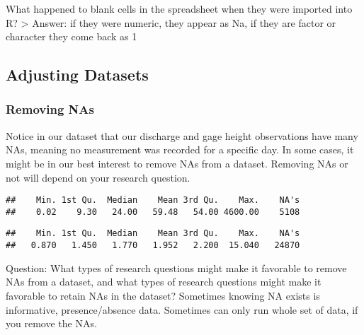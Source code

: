 \documentclass[]{article}
\newenvironment{Shaded}{\begin{snugshade}}{\end{snugshade}}
\newcommand{\KeywordTok}[1]{\textcolor[rgb]{0.13,0.29,0.53}{\textbf{#1}}}
\newcommand{\NormalTok}[1]{#1}
\newcommand{\OperatorTok}[1]{\textcolor[rgb]{0.81,0.36,0.00}{\textbf{#1}}}
\begin{document}
What happened to blank cells in the spreadsheet when they were imported
into R? \textgreater{} Answer: if they were numeric, they appear as Na,
if they are factor or character they come back as 1

\hypertarget{adjusting-datasets}{%
\subsection{Adjusting Datasets}\label{adjusting-datasets}}

\hypertarget{removing-nas}{%
\subsubsection{Removing NAs}\label{removing-nas}}

Notice in our dataset that our discharge and gage height observations
have many NAs, meaning no measurement was recorded for a specific day.
In some cases, it might be in our best interest to remove NAs from a
dataset. Removing NAs or not will depend on your research question.

\begin{Shaded}
\end{Shaded}

\begin{verbatim}
##    Min. 1st Qu.  Median    Mean 3rd Qu.    Max.    NA's 
##    0.02    9.30   24.00   59.48   54.00 4600.00    5108
\end{verbatim}

\begin{Shaded}
\end{Shaded}

\begin{verbatim}
##    Min. 1st Qu.  Median    Mean 3rd Qu.    Max.    NA's 
##   0.870   1.450   1.770   1.952   2.200  15.040   24870
\end{verbatim}

Question: What types of research questions might make it favorable to
remove NAs from a dataset, and what types of research questions might
make it favorable to retain NAs in the dataset? Sometimes knowing NA
exists is informative, presence/absence data. Sometimes can only run
whole set of data, if you remove the NAs.
\end{document}
